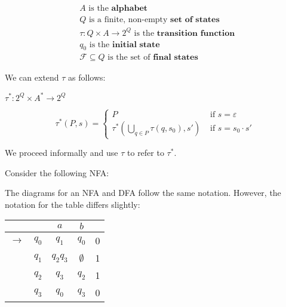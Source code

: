 \begin{align*}
    &A\text{ is the }\textbf{alphabet}\\
    &Q\text{ is a finite, non-empty }\textbf{set of states}\\
    &\tau:Q\times A\to 2^Q\text{ is the }\textbf{transition function }\\
    &q_0\text{ is the }\textbf{initial state}\\
    &\mathcal{F}\subseteq Q\text{ is the set of }\textbf{final states}
\end{align*}

We can extend $\tau$ as follows: 

$\tau^*:2^Q\times A^*\to 2^Q$

\[\tau^*(P, s) = \begin{cases} P &\mbox{ if } s=\varepsilon\\
                             \tau^*\left(\displaystyle\bigcup_{q\in P}\tau(q, s_0), s'\right) &\mbox{ if } s=s_0\cdot s'\end{cases}\]

We proceed informally and use $\tau$ to refer to $\tau^*$. 

Consider the following NFA:

\begin{center}\end{center}

The diagrams for an NFA and DFA follow the same notation. However, the notation for the table differs slightly:

\begin{center}\begin{tabular}{c c|c c r}
         & & $a$ & $b$ & \\\hline
    $\to$ & $q_0$ & $q_1$ & $q_0$ & 0 \\
    & $q_1$ & $q_2q_3$ & $\emptyset$ & 1 \\
    & $q_2$ & $q_3$ & $q_2$ & 1\\
    & $q_3$ & $q_0$ & $q_3$ & 0\\
\end{tabular}\end{center}

